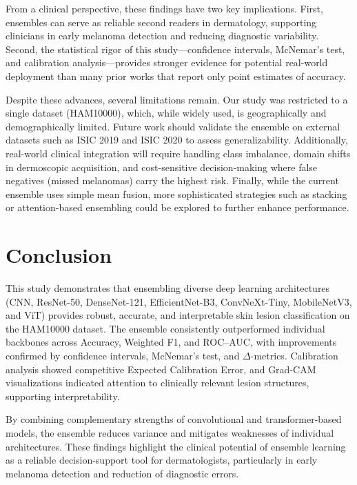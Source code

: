 \documentclass[preprint,12pt]{elsarticle}
\begin{document}
From a clinical perspective, these findings have two key implications. 
First, ensembles can serve as reliable second readers in dermatology, supporting clinicians in early melanoma detection and reducing diagnostic variability. 
Second, the statistical rigor of this study—confidence intervals, McNemar’s test, and calibration analysis—provides stronger evidence for potential real-world deployment than many prior works that report only point estimates of accuracy. 

Despite these advances, several limitations remain. 
Our study was restricted to a single dataset (HAM10000), which, while widely used, is geographically and demographically limited. 
Future work should validate the ensemble on external datasets such as ISIC 2019 and ISIC 2020 to assess generalizability. 
Additionally, real-world clinical integration will require handling class imbalance, domain shifts in dermoscopic acquisition, and cost-sensitive decision-making where false negatives (missed melanomas) carry the highest risk. 
Finally, while the current ensemble uses simple mean fusion, more sophisticated strategies such as stacking or attention-based ensembling could be explored to further enhance performance.

\section{Conclusion}

This study demonstrates that ensembling diverse deep learning architectures 
(CNN, ResNet-50, DenseNet-121, EfficientNet-B3, ConvNeXt-Tiny, MobileNetV3, and ViT) 
provides robust, accurate, and interpretable skin lesion classification on the HAM10000 dataset. 
The ensemble consistently outperformed individual backbones across Accuracy, Weighted F1, and ROC--AUC, 
with improvements confirmed by confidence intervals, McNemar’s test, and $\Delta$-metrics. 
Calibration analysis showed competitive Expected Calibration Error, and Grad-CAM visualizations indicated 
attention to clinically relevant lesion structures, supporting interpretability.

By combining complementary strengths of convolutional and transformer-based models, the ensemble reduces 
variance and mitigates weaknesses of individual architectures. 
These findings highlight the clinical potential of ensemble learning as a reliable decision-support tool 
for dermatologists, particularly in early melanoma detection and reduction of diagnostic errors.
\end{document}
